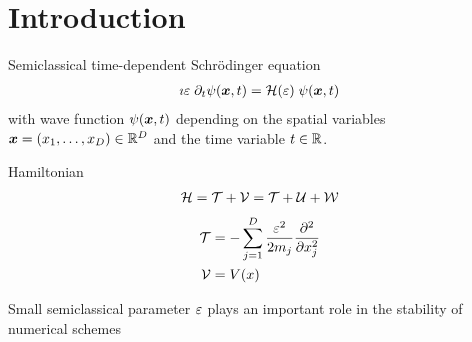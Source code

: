 





\clearemptydoublepage

\mbox{}
\vfill

\vfill
\tableofcontents

\clearpage

\listoffigures
\listofalgorithms

\clearemptydoublepage

% 
% 
% 
% 
% 
% 






\clearpage
\section{Introduction}

\cite{GH_convsemiclassical}
Semiclassical time-dependent Schrödinger equation
%
\begin{align}
	\label{math:tdse}
	\imath \varepsilon \; \partial_t \psi (\bm{x},t) = \mathcal{H} (\varepsilon) \; \psi (\bm{x},t)
\end{align}
%
with wave function $\psi(\bm{x},t)$ depending on the spatial variables $\bm{x} = (x_1,\dots,x_D) \in \mathbb{R}^D$ and the time variable $t \in \mathbb{R}$.

Hamiltonian
\begin{align}
	\mathcal{H} = \mathcal{T} + \mathcal{V} = \mathcal{T} + \mathcal{U} + \mathcal{W}
\end{align}
\begin{align}
	\mathcal{T} &= - \sum_{j=1}^D \frac{\varepsilon^2}{2m_j} \frac{\partial^2}{\partial x_j^2} \\
	\mathcal{V} &= V(x)
\end{align}

Small semiclassical parameter $\varepsilon$ plays an important role in the stability of numerical schemes

